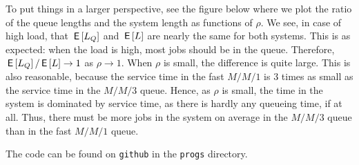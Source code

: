\begin{exercise}
\begin{solution}
To put things in a larger perspective, see
the figure below where we plot the ratio of the queue
lengths and the system length as functions of $\rho$. We see, in case
of high load, that $\,\mathsf{E}\left[L_Q\right]$ and $\,\mathsf{E}\left[L\right]$ are nearly the same for both
systems. This is as expected: when the load is high, most jobs should
be in the queue. Therefore, $\,\mathsf{E}\left[L_Q\right]/\,\mathsf{E}\left[L\right] \to 1$ as $\rho\to 1$. When
$\rho$ is small, the difference is quite large. This is also
reasonable, because the service time in the fast $M/M/1$ is 3 times as
small as the service time in the $M/M/3$ queue. Hence, as $\rho$ is
small, the time in the system is dominated by service time, as there
is hardly any queueing time, if at all. Thus, there must be more jobs
in the system on average in the $M/M/3$ queue than in the fast $M/M/1$
queue.

\begin{center}

\end{center}

The code can be found on \texttt{github} in the \texttt{progs} directory.
\end{solution}
\end{exercise}


